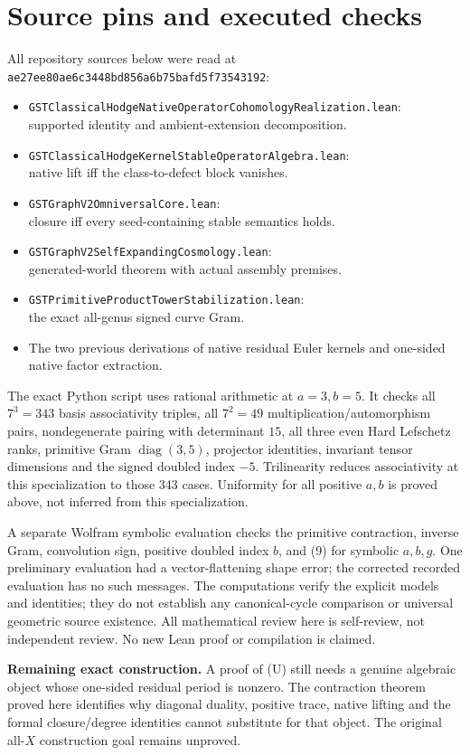 \documentclass[11pt]{article}
\begin{document}
\section{Source pins and executed checks}
All repository sources below were read at
\texttt{ae27ee80ae6c3448bd856a6b75bafd5f73543192}:
\begin{itemize}
\item \texttt{GSTClassicalHodgeNativeOperatorCohomologyRealization.lean}:\\
supported identity and ambient-extension decomposition.
\item \texttt{GSTClassicalHodgeKernelStableOperatorAlgebra.lean}:\\
native lift iff the class-to-defect block vanishes.
\item \texttt{GSTGraphV2OmniversalCore.lean}:\\
closure iff every seed-containing stable semantics holds.
\item \texttt{GSTGraphV2SelfExpandingCosmology.lean}:\\
generated-world theorem with actual assembly premises.
\item \texttt{GSTPrimitiveProductTowerStabilization.lean}:\\
the exact all-genus signed curve Gram.
\item The two previous derivations of native residual Euler kernels
and one-sided native factor extraction.
\end{itemize}
The exact Python script uses rational arithmetic at \(a=3,b=5\).
It checks all \(7^3=343\) basis associativity triples, all
\(7^2=49\) multiplication/automorphism pairs, nondegenerate pairing
with determinant \(15\), all three even Hard Lefschetz ranks,
primitive Gram \(\operatorname{diag}(3,5)\), projector identities,
invariant tensor dimensions and the signed doubled index \(-5\).
Trilinearity reduces associativity at this specialization to those
343 cases. Uniformity for all positive \(a,b\) is proved above,
not inferred from this specialization.

A separate Wolfram symbolic evaluation checks the primitive
contraction, inverse Gram, convolution sign, positive doubled index
\(b\), and (9) for symbolic \(a,b,g\). One preliminary evaluation
had a vector-flattening shape error; the corrected recorded evaluation
has no such messages. The computations verify the explicit models
and identities; they do not establish any canonical-cycle comparison
or universal geometric source existence.
All mathematical review here is self-review, not independent review.
No new Lean proof or compilation is claimed.

\medskip
\noindent\textbf{Remaining exact construction.}
A proof of (U) still needs a genuine algebraic object whose one-sided
residual period is nonzero. The contraction theorem proved here identifies
why diagonal duality, positive trace, native lifting and the formal
closure/degree identities cannot substitute for that object.
The original all-\(X\) construction goal remains unproved.
\end{document}
